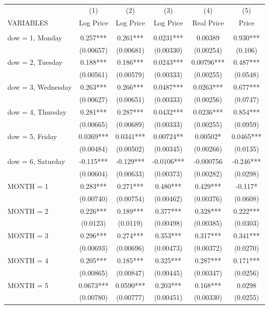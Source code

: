 \begin{tabular}{lccccc} \hline
 & (1) & (2) & (3) & (4) & (5) \\
VARIABLES & Log Price & Log Price & Log Price & Real Price & Price \\ \hline
 &  &  &  &  &  \\
dow = 1, Monday & 0.257*** & 0.261*** & 0.0231*** & 0.00389 & 0.930*** \\
 & (0.00657) & (0.00681) & (0.00330) & (0.00254) & (0.106) \\
dow = 2, Tuesday & 0.188*** & 0.186*** & 0.0243*** & 0.00796*** & 0.487*** \\
 & (0.00561) & (0.00579) & (0.00333) & (0.00255) & (0.0548) \\
dow = 3, Wednesday & 0.263*** & 0.266*** & 0.0487*** & 0.0263*** & 0.677*** \\
 & (0.00627) & (0.00651) & (0.00333) & (0.00256) & (0.0747) \\
dow = 4, Thursday & 0.281*** & 0.287*** & 0.0432*** & 0.0236*** & 0.854*** \\
 & (0.00665) & (0.00689) & (0.00333) & (0.00255) & (0.0959) \\
dow = 5, Friday & 0.0369*** & 0.0341*** & 0.00724** & 0.00502* & 0.0465*** \\
 & (0.00484) & (0.00502) & (0.00345) & (0.00266) & (0.0135) \\
dow = 6, Saturday & -0.115*** & -0.129*** & -0.0106*** & -0.000756 & -0.246*** \\
 & (0.00604) & (0.00633) & (0.00373) & (0.00282) & (0.0298) \\
MONTH = 1 & 0.283*** & 0.271*** & 0.480*** & 0.429*** & -0.117* \\
 & (0.00740) & (0.00754) & (0.00462) & (0.00376) & (0.0608) \\
MONTH = 2 & 0.226*** & 0.189*** & 0.377*** & 0.328*** & 0.222*** \\
 & (0.0123) & (0.0119) & (0.00498) & (0.00385) & (0.0303) \\
MONTH = 3 & 0.296*** & 0.274*** & 0.353*** & 0.317*** & 0.341*** \\
 & (0.00693) & (0.00696) & (0.00473) & (0.00372) & (0.0270) \\
MONTH = 4 & 0.205*** & 0.185*** & 0.325*** & 0.287*** & 0.171*** \\
 & (0.00865) & (0.00847) & (0.00445) & (0.00347) & (0.0256) \\
MONTH = 5 & 0.0673*** & 0.0590*** & 0.203*** & 0.168*** & 0.0298 \\
 & (0.00780) & (0.00777) & (0.00451) & (0.00330) & (0.0255) \\

\end{tabular}
